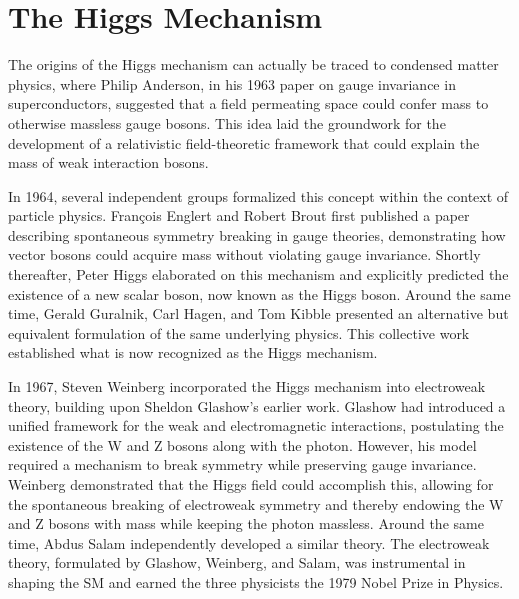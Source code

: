 




\section{The Higgs Mechanism} \label{sec:higgs}

The origins of the Higgs mechanism can actually be traced to condensed matter physics, where Philip Anderson, in his 1963 paper on gauge invariance in superconductors, suggested that a field permeating space could confer mass to otherwise massless gauge bosons. This idea laid the groundwork for the development of a relativistic field-theoretic framework that could explain the mass of weak interaction bosons.

In 1964, several independent groups formalized this concept within the context of particle physics. François Englert and Robert Brout first published a paper describing spontaneous symmetry breaking in gauge theories, demonstrating how vector bosons could acquire mass without violating gauge invariance. Shortly thereafter, Peter Higgs elaborated on this mechanism and explicitly predicted the existence of a new scalar boson, now known as the Higgs boson. Around the same time, Gerald Guralnik, Carl Hagen, and Tom Kibble presented an alternative but equivalent formulation of the same underlying physics. This collective work established what is now recognized as the Higgs mechanism.

In 1967, Steven Weinberg incorporated the Higgs mechanism into electroweak theory, building upon Sheldon Glashow’s earlier work. Glashow had introduced a unified framework for the weak and electromagnetic interactions, postulating the existence of the W and Z bosons along with the photon. However, his model required a mechanism to break symmetry while preserving gauge invariance. Weinberg demonstrated that the Higgs field could accomplish this, allowing for the spontaneous breaking of electroweak symmetry and thereby endowing the W and Z bosons with mass while keeping the photon massless. Around the same time, Abdus Salam independently developed a similar theory. The electroweak theory, formulated by Glashow, Weinberg, and Salam, was instrumental in shaping the SM and earned the three physicists the 1979 Nobel Prize in Physics.

